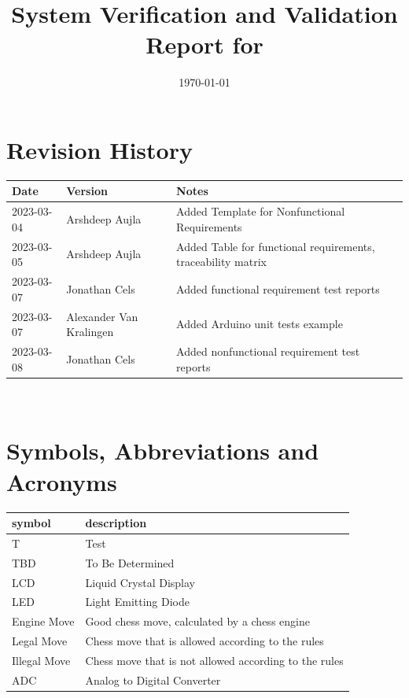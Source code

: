 \documentclass[12pt, titlepage]{article}
\begin{document}
\title{System Verification and Validation Report for \progname{}} 
\author{\authname}
\date{\today}
	
\maketitle


\section{Revision History}

\begin{tabularx}{\textwidth}{p{3cm}p{2cm}X}
\toprule {\bf Date} & {\bf Version} & {\bf Notes}\\
\midrule
2023-03-04 & Arshdeep Aujla & Added Template for Nonfunctional Requirements\\
2023-03-05 & Arshdeep Aujla & Added Table for functional requirements, traceability matrix\\
2023-03-07 & Jonathan Cels & Added functional requirement test reports\\
2023-03-07 & Alexander Van Kralingen & Added Arduino unit tests example\\
2023-03-08 & Jonathan Cels & Added nonfunctional requirement test reports\\
\bottomrule
\end{tabularx}

~\newpage

\section{Symbols, Abbreviations and Acronyms}

\renewcommand{\arraystretch}{1.2}
\begin{tabular}{l l} 
    \toprule		
    \textbf{symbol} & \textbf{description}\\
    \midrule 
    T & Test\\
    TBD & To Be Determined\\
    LCD & Liquid Crystal Display\\
    LED & Light Emitting Diode\\
    Engine Move & Good chess move, calculated by a chess engine\\
    Legal Move & Chess move that is allowed according to the rules\\
    Illegal Move & Chess move that is not allowed according to the rules\\
    ADC & Analog to Digital Converter\\
  \bottomrule
\end{tabular}\\
\end{document}
